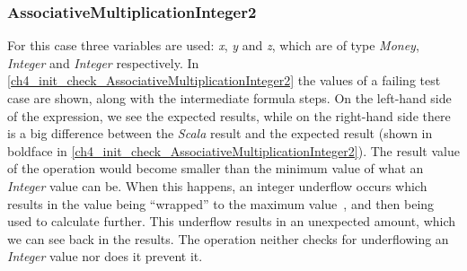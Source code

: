 \subsubsection{AssociativeMultiplicationInteger2}
For this case three variables are used: \textit{x}, \textit{y} and \textit{z},
which are of type \textit{Money}, \textit{Integer} and \textit{Integer}
respectively. In \autoref{ch4_init_check_AssociativeMultiplicationInteger2} the
values of a failing test case are shown, along with the intermediate formula
steps. On the left-hand side of the expression, we see the expected results,
while on the right-hand side there is a big difference between the
\textit{Scala} result and the expected result (shown in boldface in
\autoref{ch4_init_check_AssociativeMultiplicationInteger2}). The result value of
the operation would become smaller than the minimum value of what an
\textit{Integer} value can be. When this happens, an integer underflow occurs
which results in the value being ``wrapped'' to the maximum
value~\cite{brumley2007rich}, and then being used to calculate further. This
underflow results in an unexpected amount, which we can see back in the results.
The operation neither checks for underflowing an \textit{Integer} value nor does
it prevent it.
